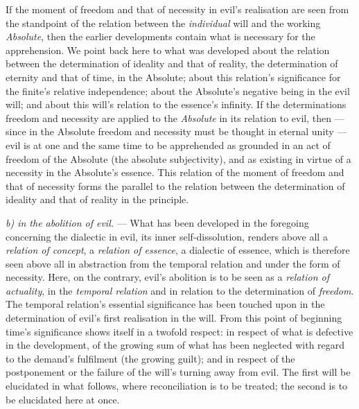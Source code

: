 \documentclass[12pt,a4paper]{book}
\begin{document}
If the moment of freedom and that of necessity in evil's realisation are seen
from the standpoint of the relation between the \emph{individual} will and the
working \emph{Absolute}, then the earlier developments contain what is necessary
for the apprehension. We point back here to what was developed about the
relation between the determination of ideality and that of reality, the
determination of eternity and that of time, in the Absolute; about this
relation's significance for the finite's relative independence; about the
Absolute's negative being in the evil will; and about this will's relation to
the essence's infinity. If the determinations freedom and necessity are applied
to the \emph{Absolute} in its relation to evil, then --- since in the
Absolute freedom and necessity must be thought in eternal unity --- evil is at
one and the same time to be apprehended as grounded in an act of freedom of the
Absolute (the absolute subjectivity), and as existing in virtue of a necessity
in the Absolute's essence. This relation of the moment of freedom and that of
necessity forms the parallel to the relation between the determination of
ideality and that of reality in the principle.

\emph{b) in the abolition of evil.} --- What has been developed in the foregoing
concerning the dialectic in evil, its inner self-dissolution, renders above all
a \emph{relation of concept}, a \emph{relation of essence}, a dialectic of
essence, which is therefore seen above all in abstraction from the temporal
relation and under the form of necessity. Here, on the contrary, evil's
abolition is to be seen as a \emph{relation of actuality}, in the
\emph{temporal relation} and in relation to the determination of
\emph{freedom}. The temporal relation's essential significance has been touched
upon in the determination of evil's first realisation in the will. From this
point of beginning time's significance shows itself in a twofold respect: in
respect of what is defective in the development, of the growing sum of what has
been neglected with regard to the demand's fulfilment (the growing guilt); and
in respect of the postponement or the failure of the will's turning away from
evil. The first will be elucidated in what follows, where reconciliation is to
be treated; the second is to be elucidated here at once.
\end{document}

